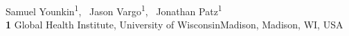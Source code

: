 \documentclass[10pt,letterpaper]{article}
\date{}
\begin{document}
\vspace*{0.2in}

\begin{flushleft}
{\Large
\textbf{} %
}
\newline
\\
Samuel Younkin\textsuperscript{1},\ %
Jason Vargo\textsuperscript{1},\ %
Jonathan Patz\textsuperscript{1}%
\\
\bigskip
\textbf{1} Global Health Institute, University of Wisconsin{\textendash}Madison, Madison, WI, USA
\\
\bigskip

% 
%








\end{flushleft}
\end{document}
